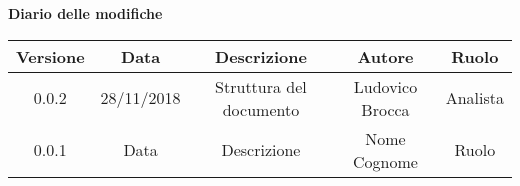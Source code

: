 \begin{center}
		\textbf{Diario delle modifiche}
	\end{center}
	\begin{center}
		\begin{tabular}{|c|c|c|c|c|}
			\hline
			\textbf{Versione} & \textbf{Data} & \textbf{Descrizione} & \textbf{Autore} & \textbf{Ruolo} \\
			\hline 
			0.0.2 & 28/11/2018 & Struttura del documento & Ludovico Brocca & Analista\\
			\hline
			0.0.1 & Data & Descrizione & Nome Cognome & Ruolo \\
			\hline
		\end{tabular}
	\end{center}
\newpage
